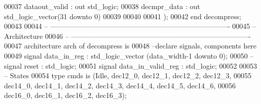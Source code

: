 \begin{DoxyCode}
00037         \textcolor{vhdlchar}{dataout_valid} \textcolor{vhdlchar}{:} \textcolor{keywordflow}{out} \textcolor{comment}{std\_logic};
00038         \textcolor{vhdlchar}{decmpr_data}   \textcolor{vhdlchar}{:} \textcolor{keywordflow}{out} \textcolor{comment}{std\_logic\_vector}\textcolor{vhdlchar}{(}\textcolor{vhdllogic}{}\textcolor{vhdllogic}{31} \textcolor{keywordflow}{downto} \textcolor{vhdllogic}{}\textcolor{vhdllogic}{0}\textcolor{vhdlchar}{)}
00039 
00040      
00041         \textcolor{vhdlchar}{)};
00042 \textcolor{keywordflow}{end} \textcolor{vhdlchar}{decompress};
00043 
00044 \textcolor{keyword}{-- ----------------------------------------------------------------------------}
00045 \textcolor{keyword}{-- Architecture}
00046 \textcolor{keyword}{-- ----------------------------------------------------------------------------}
00047 \textcolor{keywordflow}{architecture} arch \textcolor{keywordflow}{of} decompress is
00048 \textcolor{keyword}{--declare signals,  components here}
00049 \textcolor{keywordflow}{signal} \textcolor{vhdlchar}{data_in_reg} \textcolor{vhdlchar}{:} \textcolor{comment}{std\_logic\_vector} \textcolor{vhdlchar}{(}\textcolor{vhdlchar}{data_width}\textcolor{vhdlchar}{-}\textcolor{vhdllogic}{}\textcolor{vhdllogic}{1} \textcolor{keywordflow}{downto} \textcolor{vhdllogic}{}\textcolor{vhdllogic}{0}\textcolor{vhdlchar}{)};
00050 \textcolor{keyword}{--signal reset : std\_logic;}
00051 \textcolor{keywordflow}{signal} \textcolor{vhdlchar}{data_in_valid_reg} \textcolor{vhdlchar}{:} \textcolor{comment}{std\_logic}; 
00052 
00053 \textcolor{keyword}{-- States}
00054     \textcolor{keywordflow}{type} \textcolor{vhdlchar}{cmds} \textcolor{keywordflow}{is} \textcolor{vhdlchar}{(}\textcolor{vhdlchar}{Idle}\textcolor{vhdlchar}{,} \textcolor{vhdlchar}{dec12\_0}\textcolor{vhdlchar}{,} \textcolor{vhdlchar}{dec12\_1}\textcolor{vhdlchar}{,} \textcolor{vhdlchar}{dec12\_2}\textcolor{vhdlchar}{,} \textcolor{vhdlchar}{dec12\_3}\textcolor{vhdlchar}{,} 
00055                    \textcolor{vhdlchar}{dec14\_0}\textcolor{vhdlchar}{,} \textcolor{vhdlchar}{dec14\_1}\textcolor{vhdlchar}{,} \textcolor{vhdlchar}{dec14\_2}\textcolor{vhdlchar}{,} \textcolor{vhdlchar}{dec14\_3}\textcolor{vhdlchar}{,} \textcolor{vhdlchar}{dec14\_4}\textcolor{vhdlchar}{,} \textcolor{vhdlchar}{dec14\_5}\textcolor{vhdlchar}{,} \textcolor{vhdlchar}{dec14\_6}\textcolor{vhdlchar}{,}
00056                    \textcolor{vhdlchar}{dec16\_0}\textcolor{vhdlchar}{,} \textcolor{vhdlchar}{dec16\_1}\textcolor{vhdlchar}{,} \textcolor{vhdlchar}{dec16\_2}\textcolor{vhdlchar}{,} \textcolor{vhdlchar}{dec16\_3}\textcolor{vhdlchar}{)};

\end{DoxyCode}

